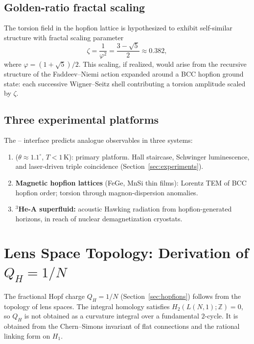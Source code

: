 \documentclass[11pt,letterpaper]{article}
\begin{document}
\subsection{Golden-ratio fractal scaling}

The torsion field in the hopfion lattice is hypothesized to exhibit self-similar structure with fractal scaling parameter
\begin{equation}
\zeta = \frac{1}{\varphi^2} = \frac{3 - \sqrt{5}}{2} \approx 0.382,
\end{equation}
where $\varphi = (1+\sqrt{5})/2$. This scaling, if realized, would arise from the recursive structure of the Faddeev--Niemi action expanded around a BCC hopfion ground state: each successive Wigner--Seitz shell contributing a torsion amplitude scaled by $\zeta$.

\subsection{Three experimental platforms}

The \TDVT--\QVC{} interface predicts analogue observables in three systems:
\begin{enumerate}
    \item \textbf{\MATBG{} \TEVC{}} ($\theta \approx 1.1^\circ$, $T < 1$\,K): primary platform. Hall staircase, Schwinger luminescence, and laser-driven triple coincidence (Section~\ref{sec:experiments}).
    \item \textbf{Magnetic hopfion lattices} (FeGe, MnSi thin films): Lorentz TEM of BCC hopfion order; torsion through magnon-dispersion anomalies.
    \item \textbf{${}^3$He-A superfluid:} acoustic Hawking radiation from hopfion-generated horizons, in reach of nuclear demagnetization cryostats.
\end{enumerate}

\section{Lens Space Topology: Derivation of $Q_H = 1/N$}
\label{sec:lens_space_proof}

The fractional Hopf charge $Q_H = 1/N$ (Section~\ref{sec:hopfions}) follows from the topology of lens spaces. The integral homology satisfies $H_2(L(N,1);\mathbb{Z})=0$, so $Q_H$ is not obtained as a curvature integral over a fundamental $2$-cycle. It is obtained from the Chern--Simons invariant of flat connections and the rational linking form on $H_1$\cite{Witten1989,Jeffrey1992}.
\end{document}
